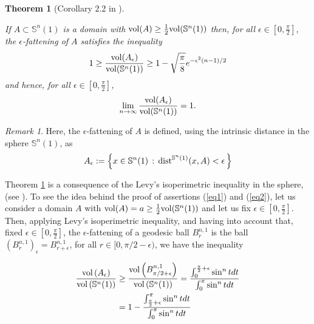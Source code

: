 \documentclass[11pt,letterpaper]{amsart}
\newtheorem{theoremA}{Theorem}
\theoremstyle{definition}
\theoremstyle{remark}
\newtheorem{remark}[theorem]{Remark}
\newcommand{\ese}{\mathbb{S}}
\begin{document}
\begin{theoremA}[Corollary 2.2 in \cite{MS}]\label{measurecon}\

 If $A\subset \mathbb{S}^n(1)$ is a domain with ${\rm vol }(A)\geq \frac{1}{2} {\rm vol}(\mathbb{S}^n(1))$ then, for all $\epsilon \in [0,\frac{\pi}{2}]$, the  $\epsilon$-fattening of $A$ satisfies the inequality
\begin{equation}\label{eq1}
1 \geq \frac{{\rm vol}(A_\epsilon)}{{\rm vol}(\mathbb{S}^n(1))}\geq 1-\sqrt{\frac{\pi}{8}}e^{-\epsilon^2(n-1)/2}
\end{equation}
\noindent and hence, for all $\epsilon \in [0,\frac{\pi}{2}]$, 
\begin{equation}\label{eq2}
\lim_{n\to \infty} \frac{{\rm vol}(A_\epsilon)}{{\rm vol}(\mathbb{S}^n(1))}= 1.
\end{equation}
\end{theoremA}  
\begin{remark}
Here, the $\epsilon$-fattening of $A$ is defined, using the intrinsic distance in the sphere $\ese^n(1)$, as
$$A_\epsilon:=\left\{x\in \mathbb{S}^n(1)\, :\, {\rm dist}^{\mathbb{S}^n(1)}(x,A)<\epsilon\, \right\}
$$
 \end{remark}
  
 Theorem \ref{measurecon} is a consequence of the Levy's isoperimetric inequality in the sphere, (see \cite{MS}).
  To see the idea behind the proof of assertions (\ref{eq1}) and (\ref{eq2}), let us consider a  domain $A$ with ${\rm vol }(A)=a \geq \frac{1}{2} {\rm vol}(\mathbb{S}^n(1))$ and let us fix $\epsilon \in [0,\frac{\pi}{2}]$. Then,  applying Levy's isoperimetric inequality, and having into account that, fixed $\epsilon \in [0,\frac{\pi}{2}]$, the $\epsilon$-fattening of a geodesic ball $B^{n,1}_{r}$ is the ball $(B^{n,1}_{r})_{\epsilon}=B^{n,1}_{r+\epsilon}$, for all $r \in [0,\pi/2-\epsilon)$, we have the inequality
  
\begin{equation}
\begin{aligned}
\frac{{\rm vol}\left(A_\epsilon\right)}{{\rm vol}\left(\mathbb{S}^n(1)\right)}&\geq  \frac{{\rm vol}\left(B^{n,1}_{\pi/2+\epsilon}\right)}{{\rm vol}\left(\mathbb{S}^n(1)\right)}= \frac{\int _0^{\frac{\pi}{2}+\epsilon} \sin^n t dt }{\int _0^\pi \sin^n t dt }\\
&=1-\frac{\int_{\frac{\pi}{2}+\epsilon}^{\pi} \sin^n t dt }{\int _0^\pi \sin^n t dt }
\end{aligned}
\end{equation}
\end{document}
